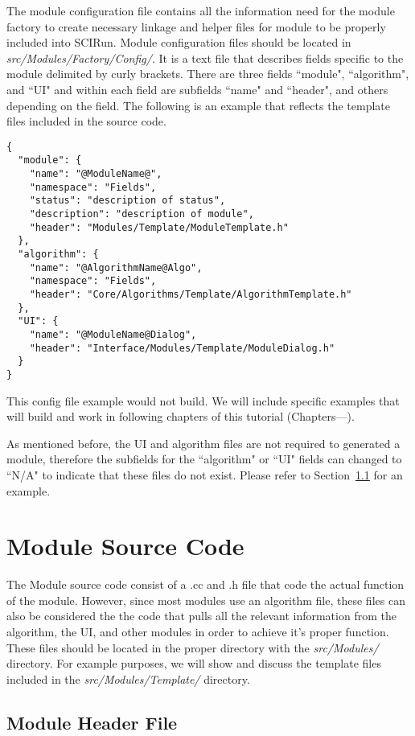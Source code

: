 \documentclass[fleqn,11pt,openany]{book}
\begin{document}
The module configuration file contains all the information need for the module factory to create necessary linkage and helper files for module to be properly included into SCIRun.  
Module configuration files should be located in \emph{src/Modules/Factory/Config/}.  
It is a text file that describes fields specific to the module delimited by curly brackets.  
There are three fields ``module", ``algorithm", and ``UI" and within each field are subfields ``name" and ``header", and others depending on the field.  
The following is an example that reflects the template files included in the source code.
\begin{verbatim}
{
  "module": {
    "name": "@ModuleName@",
    "namespace": "Fields",
    "status": "description of status",
    "description": "description of module",
    "header": "Modules/Template/ModuleTemplate.h"
  },
  "algorithm": {
    "name": "@AlgorithmName@Algo",
    "namespace": "Fields",
    "header": "Core/Algorithms/Template/AlgorithmTemplate.h"
  },
  "UI": {
    "name": "@ModuleName@Dialog",
    "header": "Interface/Modules/Template/ModuleDialog.h"
  }
}
\end{verbatim}
This config file example would not build.  
We will include specific examples that will build and work in following chapters of this tutorial (Chapters---). %

As mentioned before, the UI and algorithm files are not required to generated a module, therefore the subfields for the ``algorithm" or ``UI" fields can changed to ``N/A" to indicate that these files do not exist.  
Please refer to Section~\ref{} for an example.  %

\section{Module Source Code}
\label{sec:module}

The Module source code consist of a .cc and .h file that code the actual function of the module.
However, since most modules use an algorithm file, these files can also be considered the the code that pulls all the relevant information from the algorithm, the UI, and other modules in order to achieve it's proper function.  
These files should be located in the proper directory with the \emph{src/Modules/} directory.
For example purposes, we will show and discuss the template files included in the \emph{src/Modules/Template/} directory.

\subsection{Module Header File}
\end{document}
